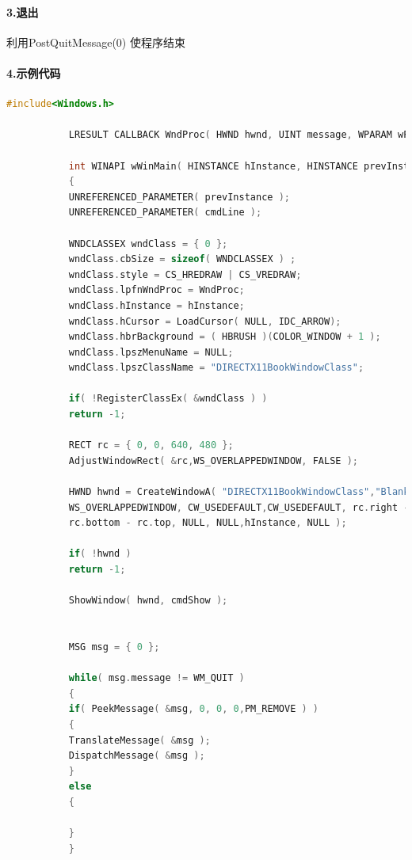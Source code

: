 \documentclass[UTF8,a4paper,8pt]{ctexart}
\begin{document}
    \paragraph {3.退出} 
        利用PostQuitMessage(0) 使程序结束
    
    \paragraph{4.示例代码}
	    \begin{lstlisting}[language=C++]
	       #include<Windows.h>  

	       LRESULT CALLBACK WndProc( HWND hwnd, UINT message, WPARAM wParam, LPARAM lParam );  

	       int WINAPI wWinMain( HINSTANCE hInstance, HINSTANCE prevInstance, LPWSTR cmdLine,int cmdShow )  
	       {  
	       UNREFERENCED_PARAMETER( prevInstance );  
	       UNREFERENCED_PARAMETER( cmdLine );  
	       
	       WNDCLASSEX wndClass = { 0 };  
	       wndClass.cbSize = sizeof( WNDCLASSEX ) ;  
	       wndClass.style = CS_HREDRAW | CS_VREDRAW;  
	       wndClass.lpfnWndProc = WndProc;  
	       wndClass.hInstance = hInstance;  
	       wndClass.hCursor = LoadCursor( NULL, IDC_ARROW);  
	       wndClass.hbrBackground = ( HBRUSH )(COLOR_WINDOW + 1 );  
	       wndClass.lpszMenuName = NULL;  
	       wndClass.lpszClassName = "DIRECTX11BookWindowClass";  
	       
	       if( !RegisterClassEx( &wndClass ) )  
	       return -1;  
	       
	       RECT rc = { 0, 0, 640, 480 };  
	       AdjustWindowRect( &rc,WS_OVERLAPPEDWINDOW, FALSE );  
	       
	       HWND hwnd = CreateWindowA( "DIRECTX11BookWindowClass","Blank Win32 Window",  
	       WS_OVERLAPPEDWINDOW, CW_USEDEFAULT,CW_USEDEFAULT, rc.right - rc.left,  
	       rc.bottom - rc.top, NULL, NULL,hInstance, NULL );  
	       
	       if( !hwnd )  
	       return -1;  
	       
	       ShowWindow( hwnd, cmdShow );  
	       

	       MSG msg = { 0 };  
	       
	       while( msg.message != WM_QUIT )  
	       {  
	       if( PeekMessage( &msg, 0, 0, 0,PM_REMOVE ) )  
	       {  
	       TranslateMessage( &msg );  
	       DispatchMessage( &msg );  
	       }  
	       else  
	       {  

	       }  
	       }  
	       

\end{lstlisting}
\end{document}
